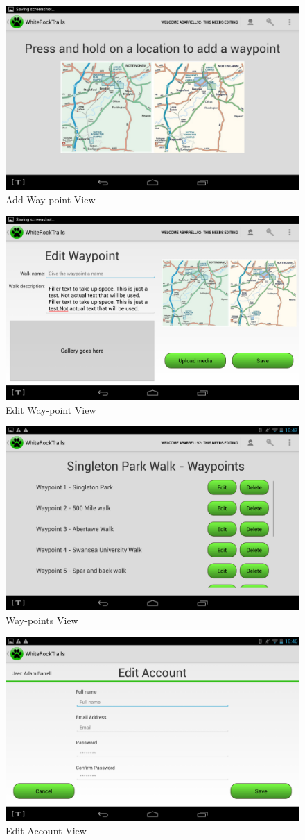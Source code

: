 \documentclass[11pt,a4paper]{article}
\begin{document}
\begin{appendices}
\begin{figure}[H]
\centering
\includegraphics[width=0.6\linewidth]{./img/location}
\caption{Add Way-point View}
\end{figure}

\begin{figure}[H]
\centering
\includegraphics[width=0.6\linewidth]{./img/edit_waypoint}
\caption{Edit Way-point View}
\end{figure}

\begin{figure}[H]
\centering
\includegraphics[width=0.6\linewidth]{./img/waypoints}
\caption{Way-points View}
\end{figure}

\begin{figure}[H]
\centering
\includegraphics[width=0.6\linewidth]{./img/account}
\caption{Edit Account View}
\end{figure}


\end{appendices}
\end{document}
